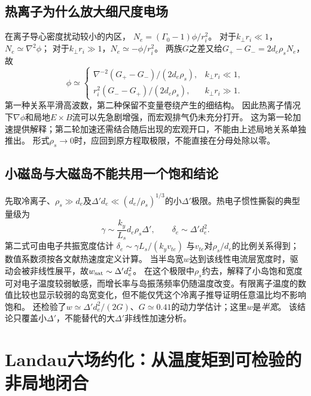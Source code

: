 \documentclass[UTF8,a4paper,11pt,openany,fontset=fandol]{ctexbook}
\begin{document}
\subsection{热离子为什么放大细尺度电场}
在离子导心密度扰动较小的内区，
$N_e=(\Gamma_0-1)\phi/r_i^2$。
对于$k_\perp r_i\ll1$，$N_e\simeq\nabla^2\phi$；
对于$k_\perp r_i\gg1$，$N_e\simeq-\phi/r_i^2$。
两族$G$之差又给$G_+-G_-=2d_e\rho_sN_e$，故
\begin{equation}
 \phi\simeq
 \begin{cases}
 \nabla^{-2}(G_+-G_-)/(2d_e\rho_s),&k_\perp r_i\ll1,\\
 r_i^2(G_--G_+)/(2d_e\rho_s),&k_\perp r_i\gg1.
 \end{cases}
\end{equation}
第一种关系平滑高波数，第二种保留不变量卷绕产生的细结构。
因此热离子情况下$\nabla\phi$和局地$E\times B$流可以先急剧增强，而宏观排气仍未充分打开。
这为第一轮加速提供解释；第二轮加速还需结合随后出现的宏观开口，不能由上述局地关系单独推出。
形式$\rho_s\to0$时，应回到原方程取极限，不能直接在分母处除以零。

\subsection{小磁岛与大磁岛不能共用一个饱和结论}
先取冷离子、$\rho_s\gg d_e$及$\Delta'd_e\ll(d_e/\rho_s)^{1/3}$的小$\Delta'$极限。热电子惯性撕裂的典型量级为
\begin{equation}
 \gamma\sim\frac{k_y}{L_s}d_e\rho_s\Delta',\qquad
 \delta_e\sim\Delta'd_e^2.
\end{equation}
第二式可由电子共振宽度估计
$\delta_e\sim\gamma L_s/(k_yv_{te})$
与$v_{te}$对$\rho_s/d_e$的比例关系得到；数值系数须按各文献热速度定义计算。
当半岛宽$w$达到该线性电流层宽度时，驱动会被非线性展平，故$w_{\rm sat}\sim\Delta'd_e^2$。
在这个极限中$\rho_s$约去，解释了小岛饱和宽度可对电子温度较弱敏感，而增长率与岛振荡频率仍随温度改变。有限离子温度的数值比较也显示较弱的岛宽变化，但不能仅凭这个冷离子推导证明任意温比均不影响饱和。
\citet{E475}还检验了$w\simeq\Delta'd_e^2/(2G)$、$G\simeq0.41$的动力学估计；这里$w$是\emph{半宽}。
该结论只覆盖小$\Delta'$，不能替代\citet{F672}的大$\Delta'$非线性加速分析。

\section{Landau六场约化：从温度矩到可检验的非局地闭合}
\end{document}
